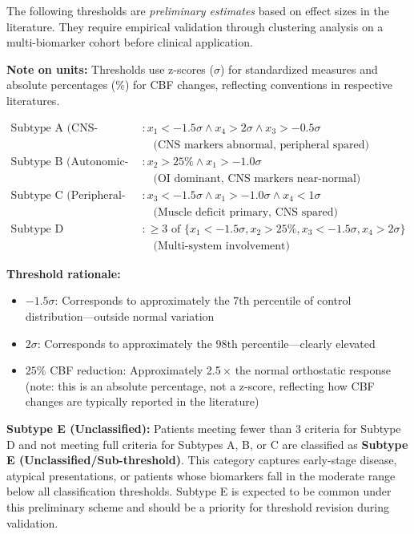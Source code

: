 \begin{speculation}
The following thresholds are \emph{preliminary estimates} based on effect sizes in the literature. They require empirical validation through clustering analysis on a multi-biomarker cohort before clinical application.

\textbf{Note on units:} Thresholds use z-scores ($\sigma$) for standardized measures and absolute percentages (\%) for CBF changes, reflecting conventions in respective literatures.

\begin{align*}
\text{Subtype A (CNS-Primary)} &: x_1 < -1.5\sigma \land x_4 > 2\sigma \land x_3 > -0.5\sigma \\
&\quad \text{(CNS markers abnormal, peripheral spared)} \\[0.5em]
\text{Subtype B (Autonomic-Primary)} &: x_2 > 25\% \land x_1 > -1.0\sigma \\
&\quad \text{(OI dominant, CNS markers near-normal)} \\[0.5em]
\text{Subtype C (Peripheral-Primary)} &: x_3 < -1.5\sigma \land x_1 > -1.0\sigma \land x_4 < 1\sigma \\
&\quad \text{(Muscle deficit primary, CNS spared)} \\[0.5em]
\text{Subtype D (Global/Advanced)} &: \geq 3 \text{ of } \{x_1 < -1.5\sigma, x_2 > 25\%, x_3 < -1.5\sigma, x_4 > 2\sigma\} \\
&\quad \text{(Multi-system involvement)}
\end{align*}

\textbf{Threshold rationale:}
\begin{itemize}
    \item $-1.5\sigma$: Corresponds to approximately the 7th percentile of control distribution---outside normal variation
    \item $2\sigma$: Corresponds to approximately the 98th percentile---clearly elevated
    \item $25\%$ CBF reduction: Approximately 2.5\,$\times$ the normal orthostatic response (note: this is an absolute percentage, not a z-score, reflecting how CBF changes are typically reported in the literature)
\end{itemize}

\textbf{Subtype E (Unclassified):} Patients meeting fewer than 3 criteria for Subtype D and not meeting full criteria for Subtypes A, B, or C are classified as \textbf{Subtype E (Unclassified/Sub-threshold)}. This category captures early-stage disease, atypical presentations, or patients whose biomarkers fall in the moderate range below all classification thresholds. Subtype E is expected to be common under this preliminary scheme and should be a priority for threshold revision during validation.


\end{speculation}
